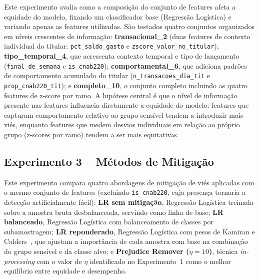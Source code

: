 Este experimento avalia como a composição do conjunto de features afeta a equidade do modelo, fixando um classificador base (Regressão Logística) e variando apenas as features utilizadas. São testados quatro conjuntos organizados em níveis crescentes de informação: \textbf{transacional\_2} (duas features de contexto individual do titular: \texttt{pct\_saldo\_gasto} e \texttt{zscore\_valor\_no\_titular}); \textbf{tipo\_temporal\_4}, que acrescenta contexto temporal e tipo de lançamento (\texttt{final\_de\_semana} e \texttt{is\_cnab220}); \textbf{comportamental\_6}, que adiciona padrões de comportamento acumulado do titular (\texttt{n\_transacoes\_dia\_tit} e \texttt{prop\_cnab220\_tit}); e \textbf{completo\_10}, o conjunto completo incluindo as quatro features de z-score por ramo. A hipótese central é que o nível de informação presente nas features influencia diretamente a equidade do modelo: features que capturam comportamento relativo ao grupo sensível tendem a introduzir mais viés, enquanto features que medem desvios individuais em relação ao próprio grupo (z-scores por ramo) tendem a ser mais equitativas.

\subsection{Experimento 3 -- Métodos de Mitigação}

Este experimento compara quatro abordagens de mitigação de viés aplicadas com o mesmo conjunto de features (excluindo \texttt{is\_cnab220}, cuja presença tornaria a detecção artificialmente fácil): \textbf{LR sem mitigação}, Regressão Logística treinada sobre a amostra bruta desbalanceada, servindo como linha de base; \textbf{LR balanceado}, Regressão Logística com balanceamento de classes por subamostragem; \textbf{LR reponderado}, Regressão Logística com pesos de Kamiran e Calders~\cite{kamiran2012data}, que ajustam a importância de cada amostra com base na combinação do grupo sensível e da classe alvo; e \textbf{Prejudice Remover ($\eta = 10$)}, técnica \textit{in-processing} com o valor de $\eta$ identificado no Experimento~1 como o melhor equilíbrio entre equidade e desempenho.